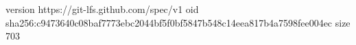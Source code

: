 version https://git-lfs.github.com/spec/v1
oid sha256:c9473640c08baf7773ebc2044bf5f0bf5847b548c14eea817b4a7598fee004ec
size 703
